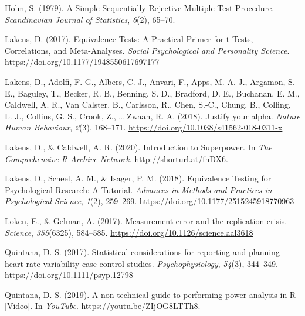 \documentclass[
]{article}
\newlength{\cslhangindent}
\newlength{\cslentryspacingunit} %
\newenvironment{CSLReferences}[2] %
 {%
  \setlength{\parindent}{0pt}
  \ifodd #1
  \let\oldpar\par
  \def\par{\hangindent=\cslhangindent\oldpar}
  \fi
  \setlength{\parskip}{#2\cslentryspacingunit}
 }%
 {}
\begin{document}
\begin{CSLReferences}{1}{0}
\leavevmode{}%
Holm, S. (1979). A {Simple Sequentially Rejective Multiple Test
Procedure}. \emph{Scandinavian Journal of Statistics}, \emph{6}(2),
65--70.

\leavevmode{}%
Lakens, D. (2017). Equivalence {Tests}: {A Practical Primer} for t
{Tests}, {Correlations}, and {Meta}-{Analyses}. \emph{Social
Psychological and Personality Science}.
\url{https://doi.org/10.1177/1948550617697177}

\leavevmode{}%
Lakens, D., Adolfi, F. G., Albers, C. J., Anvari, F., Apps, M. A. J.,
Argamon, S. E., Baguley, T., Becker, R. B., Benning, S. D., Bradford, D.
E., Buchanan, E. M., Caldwell, A. R., Van Calster, B., Carlsson, R.,
Chen, S.-C., Chung, B., Colling, L. J., Collins, G. S., Crook, Z.,
\ldots{} Zwaan, R. A. (2018). Justify your alpha. \emph{Nature Human
Behaviour}, \emph{2}(3), 168--171.
\url{https://doi.org/10.1038/s41562-018-0311-x}

\leavevmode{}%
Lakens, D., \& Caldwell, A. R. (2020). Introduction to {Superpower}. In
\emph{The Comprehensive R Archive Network}. http://shorturl.at/fnDX6.

\leavevmode{}%
Lakens, D., Scheel, A. M., \& Isager, P. M. (2018). Equivalence
{Testing} for {Psychological Research}: {A Tutorial}. \emph{Advances in
Methods and Practices in Psychological Science}, \emph{1}(2), 259--269.
\url{https://doi.org/10.1177/2515245918770963}

\leavevmode{}%
Loken, E., \& Gelman, A. (2017). Measurement error and the replication
crisis. \emph{Science}, \emph{355}(6325), 584--585.
\url{https://doi.org/10.1126/science.aal3618}

\leavevmode{}%
Quintana, D. S. (2017). Statistical considerations for reporting and
planning heart rate variability case-control studies.
\emph{Psychophysiology}, \emph{54}(3), 344--349.
\url{https://doi.org/10.1111/psyp.12798}

\leavevmode{}%
Quintana, D. S. (2019). A non-technical guide to performing power
analysis in {R} {[}{Video}{]}. In \emph{YouTube}.
https://youtu.be/ZIjOG8LTTh8.


\end{CSLReferences}
\end{document}

